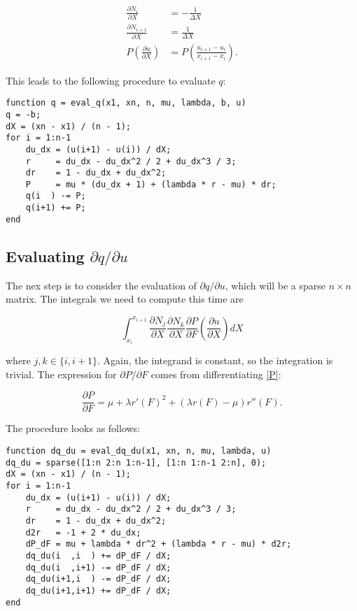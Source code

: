 \documentclass{article}
\begin{document}
\begin{align}
\frac{\partial N_i}{\partial X} & = -\frac{1}{\Delta X} \\
\frac{\partial N_{i+1}}{\partial X} & = \frac{1}{\Delta X} \\
P \left( \frac{\partial u}{\partial X} \right) & = P \left( \frac{u_{i+1} - u_i}{x_{i+1} - x_i} \right).
\end{align}

This leads to the following procedure to evaluate \(q\):

\begin{verbatim}
function q = eval_q(x1, xn, n, mu, lambda, b, u)
q = -b;
dX = (xn - x1) / (n - 1);
for i = 1:n-1
    du_dx = (u(i+1) - u(i)) / dX;
    r     = du_dx - du_dx^2 / 2 + du_dx^3 / 3;
    dr    = 1 - du_dx + du_dx^2;
    P     = mu * (du_dx + 1) + (lambda * r - mu) * dr;
    q(i  ) -= P;
    q(i+1) += P;
end
\end{verbatim}

\subsection{Evaluating \(\partial q / \partial u\)}

The nex step is to consider the evaluation of \(\partial q / \partial u\), which will be a sparse \(n \times n\) matrix.  The integrals we need to compute this time are

\begin{equation}
\int_{x_i}^{x_{i+1}} \frac{\partial N_j}{\partial X} \frac{\partial N_k}{\partial X} \frac{\partial P}{\partial F} \left( \frac{\partial u}{\partial X} \right) dX
\end{equation}

where \(j,k \in \{i, i+1\}\).  Again, the integrand is constant, so the integration is trivial.  The expression for \(\partial P / \partial F\) comes from differentiating \eqref{P}:

\begin{equation}
\frac{\partial P}{\partial F} = \mu + \lambda r'(F)^2 + \left( \lambda r(F) - \mu \right) r''(F).
\end{equation}

The procedure looks as follows:

\begin{verbatim}
function dq_du = eval_dq_du(x1, xn, n, mu, lambda, u)
dq_du = sparse([1:n 2:n 1:n-1], [1:n 1:n-1 2:n], 0);
dX = (xn - x1) / (n - 1);
for i = 1:n-1
    du_dx = (u(i+1) - u(i)) / dX;
    r     = du_dx - du_dx^2 / 2 + du_dx^3 / 3;
    dr    = 1 - du_dx + du_dx^2;
    d2r   = -1 + 2 * du_dx;
    dP_dF = mu + lambda * dr^2 + (lambda * r - mu) * d2r;
    dq_du(i  ,i  ) += dP_dF / dX;
    dq_du(i  ,i+1) -= dP_dF / dX;
    dq_du(i+1,i  ) -= dP_dF / dX;
    dq_du(i+1,i+1) += dP_dF / dX;
end
\end{verbatim}
\end{document}
